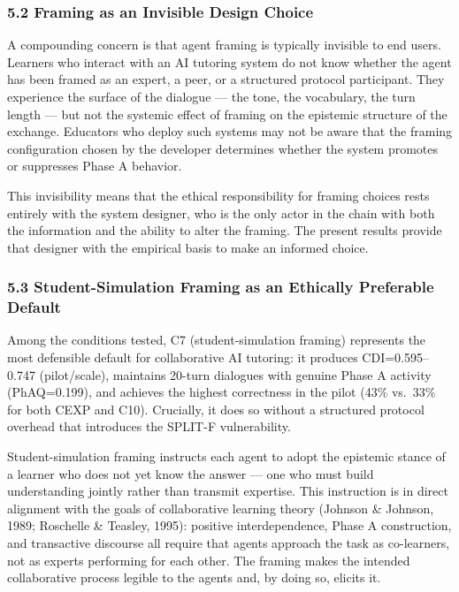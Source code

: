 \documentclass[
  11pt,
]{article}
\begin{document}
\subsubsection{5.2 Framing as an Invisible Design Choice}\label{framing-invisible-design-choice}

A compounding concern is that agent framing is typically invisible to
end users. Learners who interact with an AI tutoring system do not know
whether the agent has been framed as an expert, a peer, or a structured
protocol participant. They experience the surface of the dialogue ---
the tone, the vocabulary, the turn length --- but not the systemic
effect of framing on the epistemic structure of the exchange. Educators
who deploy such systems may not be aware that the framing configuration
chosen by the developer determines whether the system promotes or
suppresses Phase A behavior.

This invisibility means that the ethical responsibility for framing
choices rests entirely with the system designer, who is the only actor
in the chain with both the information and the ability to alter the
framing. The present results provide that designer with the empirical
basis to make an informed choice.

\subsubsection{5.3 Student-Simulation Framing as an Ethically Preferable Default}\label{student-simulation-preferred}

Among the conditions tested, C7 (student-simulation framing) represents
the most defensible default for collaborative AI tutoring: it produces
CDI=0.595--0.747 (pilot/scale), maintains 20-turn dialogues with genuine
Phase A activity (PhAQ=0.199), and achieves the highest correctness in
the pilot (43\% vs.\ 33\% for both CEXP and C10). Crucially, it does
so without a structured protocol overhead that introduces the SPLIT-F
vulnerability.

Student-simulation framing instructs each agent to adopt the epistemic
stance of a learner who does not yet know the answer --- one who must
build understanding jointly rather than transmit expertise. This
instruction is in direct alignment with the goals of collaborative
learning theory (Johnson \& Johnson, 1989; Roschelle \& Teasley, 1995):
positive interdependence, Phase A construction, and transactive discourse
all require that agents approach the task as co-learners, not as experts
performing for each other. The framing makes the intended collaborative
process legible to the agents and, by doing so, elicits it.
\end{document}
